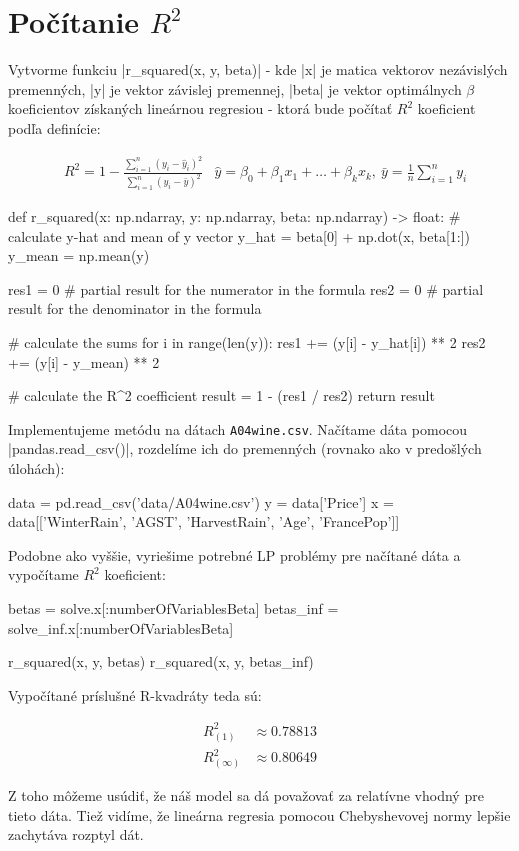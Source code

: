 \documentclass[report.tex]{subfiles}
\begin{document}
   

\section{Počítanie $R^2$}\label{sec:D}
Vytvorme funkciu \pyth|r_squared(x, y, beta)| - kde \pyth|x| je matica vektorov nezávislých premenných, \pyth|y| je vektor závislej premennej, \pyth|beta| je vektor optimálnych $\beta$ koeficientov získaných lineárnou regresiou - ktorá bude počítať $R^2$ koeficient podľa definície:

\begin{align*}
	&R^2 = 1 - \frac{\sum_{i=1}^{n} (y_i - \hat{y}_i)^2}{\sum_{i=1}^{n} (y_i - \bar{y})^2} &\hat{y} = \beta_0 + \beta_1x_1 + \dots + \beta_kx_k,~\bar{y} = \frac{1}{n} \sum_{i=1}^ny_i
\end{align*}

\begin{python}
def r_squared(x: np.ndarray, y: np.ndarray, beta: np.ndarray) -> float:
	# calculate y-hat and mean of y vector
	y_hat = beta[0] + np.dot(x, beta[1:])
	y_mean = np.mean(y)
	
	res1 = 0    # partial result for the numerator in the formula
	res2 = 0    # partial result for the denominator in the formula
	
	# calculate the sums
	for i in range(len(y)):
		res1 += (y[i] - y_hat[i]) ** 2
		res2 += (y[i] - y_mean) ** 2
	
	# calculate the R^2 coefficient
	result = 1 - (res1 / res2)
	return result
\end{python}

Implementujeme metódu na dátach \verb|A04wine.csv|. Načítame dáta pomocou \pyth|pandas.read_csv()|, rozdelíme ich do premenných (rovnako ako v predošlých úlohách):

\begin{python}
	data = pd.read_csv('data/A04wine.csv')
	y = data['Price']
	x = data[['WinterRain', 'AGST', 'HarvestRain', 'Age', 'FrancePop']]
\end{python}

Podobne ako vyššie, vyriešime potrebné LP problémy pre načítané dáta a vypočítame $R^2$ koeficient:

\begin{python}
	betas = solve.x[:numberOfVariablesBeta]
	betas_inf = solve_inf.x[:numberOfVariablesBeta]
	
	r_squared(x, y, betas)
	r_squared(x, y, betas_inf)
\end{python}
	
Vypočítané príslušné R-kvadráty teda sú:

\begin{align*}
	R^{2}_{(1)} &\approx  0.78813 \\
	R^{2}_{(\infty)} &\approx 0.80649
\end{align*}

Z toho môžeme usúdiť, že náš model sa dá považovať za relatívne vhodný pre tieto dáta. Tiež vidíme, že lineárna regresia pomocou Chebyshevovej normy lepšie zachytáva rozptyl dát.
\end{document}
